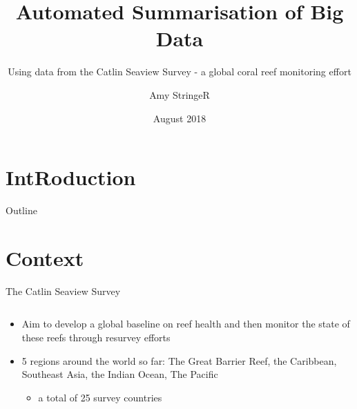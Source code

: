 \documentclass{beamer}
\title{Automated Summarisation of Big Data}
\subtitle{Using data from the Catlin Seaview Survey - a global coral reef monitoring effort}
\author{Amy StringeR}
\institute[Global Change Institute]
{
  \inst{1}%
  University of Queensland
}
\date{August 2018}
\begin{document}
    \section{IntRoduction}
        \begin{frame}
          \titlepage
        \end{frame}

        \begin{frame}{Outline}
          \tableofcontents
        \end{frame}

    \section{Context}
        \begin{frame}{The Catlin Seaview Survey}
          \begin{columns}[T]
            \begin{column}{0.45\textwidth}
              \begin{itemize}
                \item Aim to develop a global baseline on reef health and then monitor the state of these reefs through resurvey efforts
                \item 5 regions around the world so far: The Great Barrier Reef, the Caribbean, Southeast Asia, the Indian Ocean, The Pacific
                  \begin{itemize}
                    \item a total of 25 survey countries
                  \end{itemize}
              \end{itemize}
            \end{column}


\end{columns}
\end{frame}
\end{document}
